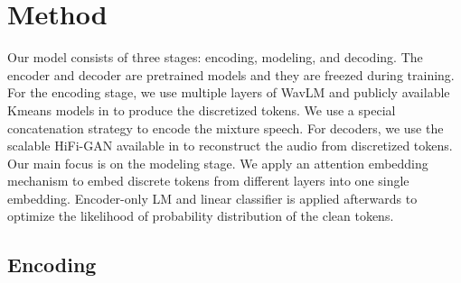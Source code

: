 \documentclass[conference]{IEEEtran}
\begin{document}
\section{Method}
Our model consists of three stages: encoding, modeling, and decoding. The encoder and decoder are 
pretrained models and they are freezed during training. For the encoding stage, we use multiple layers of WavLM 
and publicly available Kmeans 
models in \cite{dasb} to produce the discretized tokens. We use a special concatenation 
strategy to encode the mixture speech. For decoders, we use the scalable HiFi-GAN available in 
\cite{dasb} to reconstruct the audio from discretized tokens. Our main focus is on the
modeling stage. We apply an attention embedding mechanism to embed discrete tokens from different 
layers into one single embedding. Encoder-only LM and linear classifier is applied afterwards to optimize the likelihood of probability 
distribution of the clean tokens. 


\subsection{Encoding}
\end{document}
